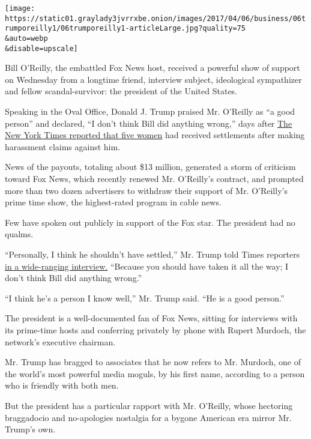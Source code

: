 \texttt{[image: https://static01.graylady3jvrrxbe.onion/images/2017/04/06/business/06trumporeilly1/06trumporeilly1-articleLarge.jpg?quality=75\\\&auto=webp\\\&disable=upscale]}

Bill O'Reilly, the embattled Fox News host, received a powerful show of
support on Wednesday from a longtime friend, interview subject,
ideological sympathizer and fellow scandal-survivor: the president of
the United States.

Speaking in the Oval Office, Donald J. Trump praised Mr. O'Reilly as ``a
good person'' and declared, ``I don't think Bill did anything wrong,''
days after
\href{https://www.nytimes3xbfgragh.onion/2017/04/01/business/media/bill-oreilly-sexual-harassment-fox-news.html}{The
New York Times reported that five women} had received settlements after
making harassment claims against him.

News of the payouts, totaling about \$13 million, generated a storm of
criticism toward Fox News, which recently renewed Mr. O'Reilly's
contract, and prompted more than two dozen advertisers to withdraw their
support of Mr. O'Reilly's prime time show, the highest-rated program in
cable news.

Few have spoken out publicly in support of the Fox star. The president
had no qualms.

``Personally, I think he shouldn't have settled,'' Mr. Trump told Times
reporters
\href{https://www.nytimes3xbfgragh.onion/2017/04/05/us/politics/trump-interview-susan-rice.html?hp\&action=click\&pgtype=Homepage\&clickSource=story-heading\&module=first-column-region\&region=top-news\&WT.nav=top-news}{in
a wide-ranging interview.} ``Because you should have taken it all the
way; I don't think Bill did anything wrong.''

``I think he's a person I know well,'' Mr. Trump said. ``He is a good
person.''

The president is a well-documented fan of Fox News, sitting for
interviews with its prime-time hosts and conferring privately by phone
with Rupert Murdoch, the network's executive chairman.

Mr. Trump has bragged to associates that he now refers to Mr. Murdoch,
one of the world's most powerful media moguls, by his first name,
according to a person who is friendly with both men.

But the president has a particular rapport with Mr. O'Reilly, whose
hectoring braggadocio and no-apologies nostalgia for a bygone American
era mirror Mr. Trump's own.

